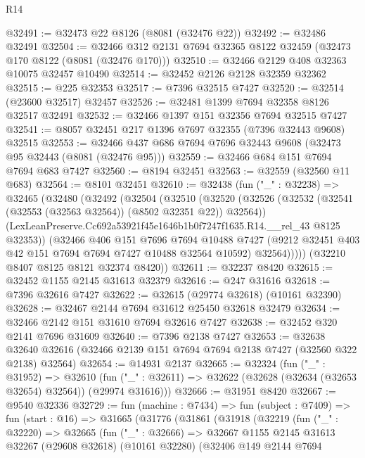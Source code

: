\begin{lexlean}{R14}
\begin{coremodule}
@32491 := @32473 @22 @8126 (@8081 (@32476 @22))
@32492 := @32486 @32491
@32504 := @32466 @312 @2131 @7694 @32365 @8122 @32459 (@32473 @170 @8122 (@8081 (@32476 @170)))
@32510 := @32466 @2129 @408 @32363 @10075 @32457 @10490
@32514 := @32452 @2126 @2128 @32359 @32362
@32515 := @225 @32353
@32517 := @7396 @32515 @7427
@32520 := @32514 (@23600 @32517) @32457
@32526 := @32481 @1399 @7694 @32358 @8126 @32517 @32491
@32532 := @32466 @1397 @151 @32356 @7694 @32515 @7427
@32541 := @8057 @32451 @217 @1396 @7697 @32355 (@7396 @32443 @9608) @32515
@32553 := @32466 @437 @686 @7694 @7696 @32443 @9608 (@32473 @95 @32443 (@8081 (@32476 @95)))
@32559 := @32466 @684 @151 @7694 @7694 @683 @7427
@32560 := @8194 @32451
@32563 := @32559 (@32560 @11 @683)
@32564 := @8101 @32451
@32610 := @32438
    (fun ("_" : @32238) =>
    @32465
      (@32480
        (@32492
          (@32504
            (@32510
              (@32520
                (@32526 (@32532 (@32541 (@32553 (@32563 @32564)) (@8502 @32351 @22)) @32564))
                (LexLeanPreserve.Cc692a53921f45e1646b1b0f7247f1635.R14.__rel_43 @8125 @32353))
              (@32466
                @406
                @151
                @7696
                @7694
                @10488
                @7427
                (@9212 @32451 @403 @42 @151 @7694 @7694 @7427 @10488 @32564 @10592)
                @32564)))))
      (@32210 @8407 @8125 @8121 @32374 @8420))
@32611 := @32237 @8420
@32615 := @32452 @1155 @2145 @31613 @32379
@32616 := @247 @31616
@32618 := @7396 @32616 @7427
@32622 := @32615 (@29774 @32618) (@10161 @32390)
@32628 := @32467 @2144 @7694 @31612 @25450 @32618 @32479
@32634 := @32466 @2142 @151 @31610 @7694 @32616 @7427
@32638 := @32452 @320 @2141 @7696 @31609
@32640 := @7396 @2138 @7427
@32653 := @32638
    @32640
    @32616
    (@32466 @2139 @151 @7694 @7694 @2138 @7427 (@32560 @322 @2138) @32564)
@32654 := @14931 @2137
@32665 := @32324
    (fun ("_" : @31952) =>
    @32610 (fun ("_" : @32611) => @32622 (@32628 (@32634 (@32653 @32654) @32564)) (@29974 @31616)))
@32666 := @31951 @8420
@32667 := @9540 @32336
@32729 := fun (machine : @7434) =>
  fun (subject : @7409) =>
  fun (start : @16) =>
  @31665
    (@31776
      (@31861
        (@31918
          (@32219
            (fun ("_" : @32220) =>
            @32665
              (fun ("_" : @32666) =>
              @32667
                @1155
                @2145
                @31613
                @32267
                (@29608 @32618)
                (@10161 @32280)
                (@32406
                  @149
                  @2144
                  @7694

\end{coremodule}
\end{lexlean}

